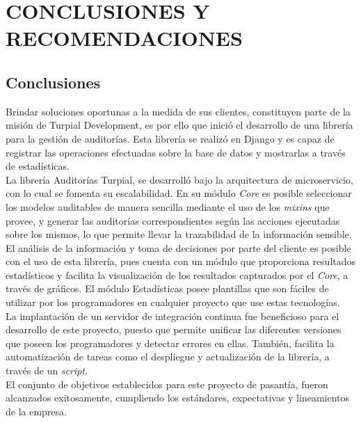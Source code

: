 {}
\chapter*{\textbf{CONCLUSIONES Y RECOMENDACIONES}}

\thispagestyle{empty}

{}
\section*{Conclusiones}

Brindar soluciones oportunas a la medida de sus clientes, constituyen parte de la misión de Turpial Development, es por ello que inició el desarrollo de una librería para la gestión de auditorías. Esta librería se realizó en Django y es capaz de registrar las operaciones efectuadas sobre la base de datos y mostrarlas a través de estadísticas.\\

La librería Auditorías Turpial, se desarrolló bajo la arquitectura de microservicio, con lo cual se fomenta su escalabilidad. En su módulo \textit{Core} es posible seleccionar los modelos auditables de manera sencilla mediante el uso de los \textit{mixins} que provee, y generar las auditorías correspondientes según las acciones ejecutadas sobre los mismos, lo que permite llevar la trazabilidad de la información sensible.\\

El análisis de la información y toma de decisiones por parte del cliente es posible con el uso de esta librería, pues cuenta con un módulo que proporciona resultados estadísticos y facilita la visualización de los resultados capturados por el \textit{Core}, a través de gráficos. El módulo Estadísticas posee plantillas que son fáciles de utilizar por los programadores en cualquier proyecto que use estas tecnologías.\\

La implantación de un servidor de integración continua fue beneficioso para el desarrollo de este proyecto, puesto que permite unificar las diferentes versiones que poseen los programadores y detectar errores en ellas. También, facilita la automatización de tareas como el despliegue y actualización de la librería, a través de un \textit{script}.\\

El conjunto de objetivos establecidos para este proyecto de pasantía, fueron alcanzados  exitosamente, cumpliendo los estándares, expectativas y lineamientos de la empresa.\\

